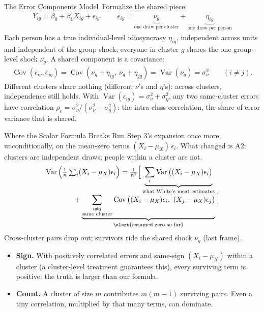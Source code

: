 \documentclass[aspectratio=169,11pt,xcolor=dvipsnames]{beamer}
\DeclareMathOperator{\Cov}{Cov}
\DeclareMathOperator{\Var}{Var}
\newcommand{\core}{\,\raisebox{0.6pt}{\textcolor{corestar}{$\bigstar$}}}
\begin{document}
\begin{frame}{The Error Components Model\core}
Formalize the shared piece:
\begingroup
\setlength{\abovedisplayskip}{2pt}\setlength{\belowdisplayskip}{2pt}
\begin{align*}
  Y_{ig} = \beta_0 + \beta_1 X_{ig} + \epsilon_{ig},
  \qquad
  \epsilon_{ig}
  = \underbrace{\nu_g}_{\text{one draw per cluster}}
  + \underbrace{\eta_{ig}}_{\text{one draw per person}}
\end{align*}
Each person has a true individual-level idiosyncrasy $\eta_{ig}$,
independent across units and independent of the group shock; everyone in
cluster $g$ shares the one group-level shock $\nu_g$. A shared component is
a covariance:
\begin{align*}
  \Cov(\epsilon_{ig}, \epsilon_{jg})
  = \Cov(\nu_g + \eta_{ig},\ \nu_g + \eta_{jg})
  = \Var(\nu_g) = \sigma_\nu^2
  \qquad (i \neq j) .
\end{align*}
\endgroup
Different clusters share nothing (different $\nu$'s and $\eta$'s):
\alert{across clusters, independence still holds}.
\vskip2pt
With $\Var(\epsilon_{ig}) = \sigma_\nu^2 + \sigma_\eta^2$, any two
same-cluster errors have correlation
$\rho_e = \sigma_\nu^2\big/(\sigma_\nu^2 + \sigma_\eta^2)$: the
\alert{intra-class correlation}, the share of error variance that is shared.
\end{frame}

\begin{frame}{Where the Scalar Formula Breaks}
Run Step 3's expansion once more, unconditionally, on the mean-zero terms
$(X_i-\mu_X)\,\epsilon_i$. What changed is A2: \alert{clusters are
independent draws; people within a cluster are not.}
\begingroup\small
\setlength{\abovedisplayskip}{2pt}\setlength{\belowdisplayskip}{1pt}
\begin{align*}
  &\Var\Big(\tfrac1n\textstyle\sum_i (X_i-\mu_X)\epsilon_i\Big)
  = \frac{1}{n^2}\Big[
  \underbrace{\sum_i \Var\big((X_i-\mu_X)\epsilon_i\big)}
      _{\text{what White's meat estimates}} \\[-4pt]
  &\qquad\qquad
  + \underbrace{\sum_{\substack{i \neq j \\ \text{same cluster}}}
      \Cov\big((X_i-\mu_X)\epsilon_i,\ (X_j-\mu_X)\epsilon_j\big)}
      _{\text{\alert{assumed zero so far}}}\Big]
\end{align*}
\endgroup
Cross-cluster pairs drop out; survivors ride the shared shock $\nu_g$
(last frame).
\begin{itemize}\itemsep0pt
  \item \textbf{Sign.} With positively correlated errors and same-sign
        $(X_i - \mu_X)$ within a cluster (a cluster-level treatment
        guarantees this), every surviving term is positive: \alert{the truth
        is larger than our formula}.
  \item \textbf{Count.} A cluster of size $m$ contributes $m(m-1)$ surviving
        pairs. \alert{Even a tiny correlation, multiplied by that many terms,
        can dominate.}
\end{itemize}
\end{frame}
\end{document}
